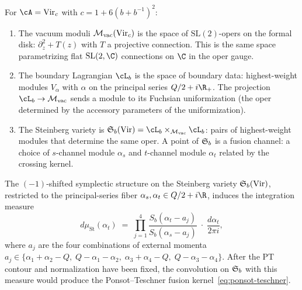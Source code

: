 \begin{construction}
\label{constr:vir-steinberg}
For $\cA = \mathrm{Vir}_c$ with $c = 1 + 6(b + b^{-1})^2$:
\begin{enumerate}[label=\textup{(\alph*)}]
\item The vacuum moduli ${\mathcal{M}_{\mathrm{vac}}}(\mathrm{Vir}_c)$ is the space of
 $\mathrm{SL}(2)$-opers on the formal disk: $\partial_z^2 +
 T(z)$ with $T$ a projective connection. This is the same space
 parametrizing flat $\mathrm{SL}(2,\C)$ connections on $\C$ in
 the oper gauge.

\item The boundary Lagrangian $\cL_b$ is the space of boundary
 data: highest-weight modules $V_\alpha$ with $\alpha$ on the
 principal series $Q/2 + i\R_+$. The projection
 $\cL_b \to \Mvac$ sends a module to its Fuchsian uniformization
 (the oper determined by the accessory parameters of the
 uniformization).

\item The Steinberg variety is
 $\Steinberg_b(\mathrm{Vir}) = \cL_b \times_{\Mvac} \cL_b$:
 pairs of highest-weight modules that determine the same oper.
 A point of $\mathfrak{S}_b$ is a fusion channel: a choice of
 $s$-channel module $\alpha_s$ and $t$-channel module $\alpha_t$
 related by the crossing kernel.
\end{enumerate}
\end{construction}

\begin{conjecture}
\label{conj:steinberg-measure}
The $(-1)$-shifted symplectic structure on the Steinberg
variety $\mathfrak{S}_b(\mathrm{Vir})$, restricted to the
principal-series fiber
$\alpha_s, \alpha_t \in Q/2 + i\R$, induces the integration
measure
\begin{equation}\label{eq:steinberg-measure}
d\mu_{\mathrm{St}}(\alpha_t)
\;=\;
\prod_{j=1}^{4}
\frac{S_b(\alpha_t - a_j)}{S_b(\alpha_s - a_j)}
\;\cdot\;
\frac{d\alpha_t}{2\pi i},
\end{equation}
where $a_j$ are the four combinations of external momenta
$a_j \in \{\alpha_1 + \alpha_2 - Q,\; Q - \alpha_1 - \alpha_2,\;
\alpha_3 + \alpha_4 - Q,\; Q - \alpha_3 - \alpha_4\}$.
After the PT contour and normalization have been fixed, the convolution
on $\mathfrak{S}_b$ with this measure would produce the
Ponsot--Teschner fusion kernel~\eqref{eq:ponsot-teschner}.
\end{conjecture}

